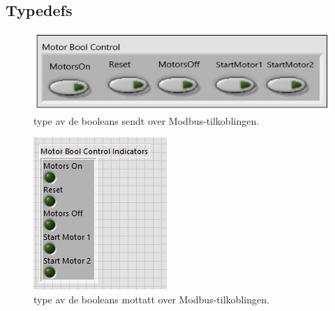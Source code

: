 \subsection{Typedefs}
\begin{multicols}{2}
\begin{figure}[H]
    \centering
    \includegraphics[width=0.5\linewidth]{vis/Motor Bool control.PNG}
    \caption{\Gls{type} av de \glspl{boolean} sendt over Modbus-tilkoblingen.}
    \label{fig:MotorBoolCl}
\end{figure}
\begin{figure}[H]
    \centering
    \includegraphics[width=0.5\linewidth]{vis/Motor Bool Indicatorsl.PNG}
    \caption{\Gls{type} av de \glspl{boolean} mottatt over Modbus-tilkoblingen.}
    \label{fig:MotorBoolInd}
\end{figure}
\begin{figure}[H]
    \centering

\end{figure}
\end{multicols}
